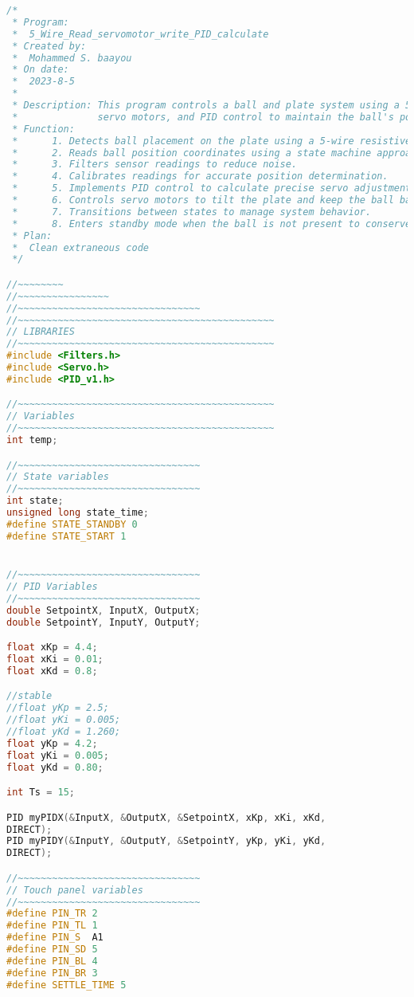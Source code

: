 \begin{lstlisting}[language=C++ , caption= Arduino  full code for controlling the system by internal PID]
/*
 * Program:
 *  5_Wire_Read_servomotor_write_PID_calculate
 * Created by:
 *  Mohammed S. baayou
 * On date:
 *  2023-8-5
 * 
 * Description: This program controls a ball and plate system using a 5-wire touch panel,
 *              servo motors, and PID control to maintain the ball's position at the center.
 * Function:
 *      1. Detects ball placement on the plate using a 5-wire resistive touch panel.
 *      2. Reads ball position coordinates using a state machine approach.
 *      3. Filters sensor readings to reduce noise.
 *      4. Calibrates readings for accurate position determination.
 *      5. Implements PID control to calculate precise servo adjustments.
 *      6. Controls servo motors to tilt the plate and keep the ball balanced.
 *      7. Transitions between states to manage system behavior.
 *      8. Enters standby mode when the ball is not present to conserve energy.
 * Plan:
 *  Clean extraneous code
 */

//~~~~~~~~
//~~~~~~~~~~~~~~~~
//~~~~~~~~~~~~~~~~~~~~~~~~~~~~~~~~
//~~~~~~~~~~~~~~~~~~~~~~~~~~~~~~~~~~~~~~~~~~~~~
// LIBRARIES
//~~~~~~~~~~~~~~~~~~~~~~~~~~~~~~~~~~~~~~~~~~~~~
#include <Filters.h>
#include <Servo.h>
#include <PID_v1.h>

//~~~~~~~~~~~~~~~~~~~~~~~~~~~~~~~~~~~~~~~~~~~~~
// Variables
//~~~~~~~~~~~~~~~~~~~~~~~~~~~~~~~~~~~~~~~~~~~~~
int temp;

//~~~~~~~~~~~~~~~~~~~~~~~~~~~~~~~~
// State variables
//~~~~~~~~~~~~~~~~~~~~~~~~~~~~~~~~
int state;
unsigned long state_time;
#define STATE_STANDBY 0
#define STATE_START 1


//~~~~~~~~~~~~~~~~~~~~~~~~~~~~~~~~
// PID Variables
//~~~~~~~~~~~~~~~~~~~~~~~~~~~~~~~~
double SetpointX, InputX, OutputX;
double SetpointY, InputY, OutputY;

float xKp = 4.4;
float xKi = 0.01;
float xKd = 0.8;

//stable
//float yKp = 2.5;
//float yKi = 0.005;
//float yKd = 1.260;
float yKp = 4.2;
float yKi = 0.005;
float yKd = 0.80;

int Ts = 15;

PID myPIDX(&InputX, &OutputX, &SetpointX, xKp, xKi, xKd,
DIRECT);
PID myPIDY(&InputY, &OutputY, &SetpointY, yKp, yKi, yKd,
DIRECT);

//~~~~~~~~~~~~~~~~~~~~~~~~~~~~~~~~
// Touch panel variables
//~~~~~~~~~~~~~~~~~~~~~~~~~~~~~~~~
#define PIN_TR 2
#define PIN_TL 1
#define PIN_S  A1
#define PIN_SD 5
#define PIN_BL 4
#define PIN_BR 3
#define SETTLE_TIME 5



\end{lstlisting}

